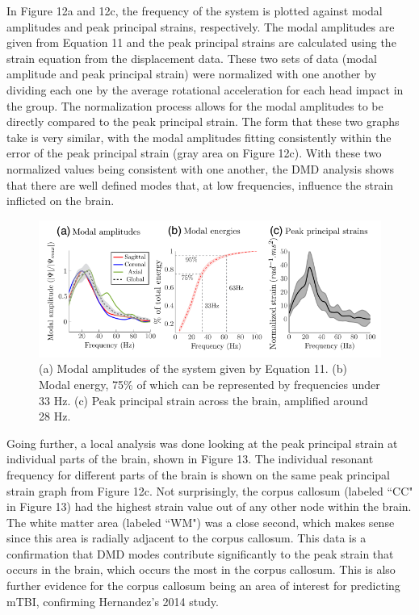 \documentclass[%
 aip,
 amsmath,amssymb,
 reprint,%
 floatfix,%
]{revtex4-1}
\begin{document}
In Figure 12a and 12c, the frequency of the system is plotted against modal amplitudes and peak principal strains, respectively. The modal amplitudes are given from Equation 11 and the peak principal strains are calculated using the strain equation from the displacement data. These two sets of data (modal amplitude and peak principal strain) were normalized with one another by dividing each one by the average rotational acceleration for each head impact in the group. The normalization process allows for the modal amplitudes to be directly compared to the peak principal strain. The form that these two graphs take is very similar, with the modal amplitudes fitting consistently within the error of the peak principal strain (gray area on Figure 12c). With these two normalized values being consistent with one another, the DMD analysis shows that there are well defined modes that, at low frequencies, influence the strain inflicted on the brain. 

\begin{figure}
	\centering
	\includegraphics[scale=0.3]{strainnormalization.png}
	\caption{(a) Modal amplitudes of the system given by Equation 11. (b) Modal energy, 75\% of which can be represented by frequencies under 33 Hz. (c) Peak principal strain across the brain, amplified around 28 Hz.}
\end{figure}

Going further, a local analysis was done looking at the peak principal strain at individual parts of the brain, shown in Figure 13. The individual resonant frequency for different parts of the brain is shown on the same peak principal strain graph from Figure 12c. Not surprisingly, the corpus callosum (labeled ``CC" in Figure 13) had the highest strain value out of any other node within the brain. The white matter area (labeled ``WM") was a close second, which makes sense since this area is radially adjacent to the corpus callosum. This data is a confirmation that DMD modes contribute significantly to the peak strain that occurs in the brain, which occurs the most in the corpus callosum. This is also further evidence for the corpus callosum being an area of interest for predicting mTBI, confirming Hernandez's 2014 study. 
\end{document}
